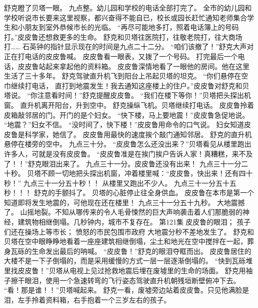 \documentclass[a4paper,12pt,UTF8,twoside]{ctexbook}
\begin{document}
        舒克瞪了贝塔一眼。 
        九点整。幼儿园和学校的电话全部打完了。 
        全市的幼儿园和学校听说市长要来这里视察，都兴奋得不能自已，校长或园长赶忙通知老师集合学生和小朋友到室外恭候市长的光临。 
        “再尽可能地多打，照着电话簿上的号码打。”皮皮鲁还想救更多的生命。 
        舒克和贝塔往医院打，往敬老院打，往大商场打…… 
        石英钟的指针显示现在的时间是九点二十二分。 
        “咱们该撤了！”舒克大声对正在打电话的皮皮鲁喊。 
        皮皮鲁看一眼表，又拨了一个号码。 
        打完最后一个电话，皮皮鲁站起来拿起他的资料箱。 
        皮皮鲁深情地看了一眼他的房间。他在这里生活了三十多年。 
        舒克驾驶直升机飞到阳台上吊起贝塔的坦克。 
        “你们悬停在空巾继续打电话，  直打到地震发生！我去通知这座楼上的住户。”皮皮鲁对舒克和贝塔说。 
        “你注意看时间！”舒克提醒皮皮鲁。 
        “我们在楼下等你！”贝塔把头探出机窗。 
        直升机离开阳台，升到空中。 
        舒克操纵飞机。贝塔继续打电话。 
        皮皮鲁拎着皮箱敲邻居的门。开门的是个妇女。 
        “快下楼，马上要地震！”皮皮鲁急促地说。 
        “地震？”妇女不信。 
        “没时间了，快下楼！”皮皮鲁用命令的口气说。 
        妇女知道皮皮鲁是科学家，她信了。 
        皮皮鲁用最快的速度挨个敲门通知邻居。 
        舒克的直升机悬停在楼旁的空中。 
        九点三十分。 
        “皮皮鲁怎么还没出来？”贝塔看见从楼里跑出许多人，可就是没有皮皮鲁。 
        “皮皮鲁准是在挨门挨户告诉人家！真糟糕，来不及了！！”舒克眼泪出来了。 
        九点三十一分。皮皮鲁还没有出来！ 
        九点三十一分二十秒。 
        贝塔不顾一切地把头探出机窗，冲着楼里喊：“皮皮鲁，快出来！还有四十秒！” 
        九点三十一分五十秒！！ 
        从楼里又跑出不少人。 
        九点三十一分五十五秒！！！ 
        舒克的手颤抖了。 
        贝塔的心脏停止往全身供血。 
        皮皮鲁在本市是第一个知道即将发生地震的，可他现在还在楼里！ 
        九点三十一分五十九秒。 
        大地震撼了。 
        山摇地裂。不知从哪传来的令人毛骨悚然的巨大声响袭击着人们那脆弱的神经，建筑物相继倒塌。几秒钟内，城市不复存在。   第121集 
        皮皮鲁的眼泪； 
        孩子们还在操场上等市长； 
        愤怒的市民包围市政府   
        大地震分秒不差地发生了。 
        舒克和贝塔在空中眼睁睁地看着一座座建筑相继倒塌，尘土和地光在空中搅拌在一起，葬身瓦砾的生命发出最后的呐喊。 
        “皮皮鲁！”舒克的眼泪夺眶而出。 
        皮皮鲁居住的大楼不是一下子倒塌的，而是采用缓慢的方式一层一层逐渐倒塌的。 
        “快到瓦砾堆里找皮皮鲁！”贝塔从电视上见过抢救地震后埋在废墟里的生命的场面。 
        舒克用袖子擦干眼泪，使用一个急速转弯的飞行姿态驾驶直升机朝残垣断壁俯冲下去。 
      “看！那是谁！！”贝塔喊起来。 
        舒克一看，废墟旁边站着皮皮鲁。只见他满脸是泪，左手拎着资料箱，右手抱着一个三岁左右的孩子。 
\end{document}
